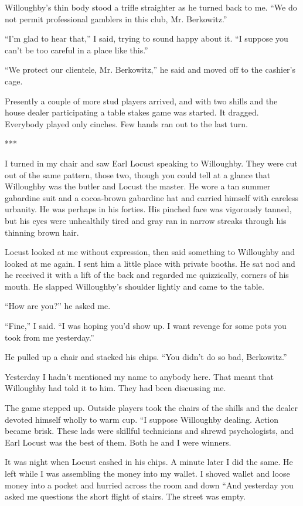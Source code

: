 \documentclass{novel}
\begin{document}
{Willoughby’s thin body stood a trifle straighter as he turned back to me. “We do not permit professional gamblers in this club, Mr. Berkowitz.”

“I’m glad to hear that,” I said, trying to sound happy about it. “I suppose you can’t be too careful in a place like this.”

“We protect our clientele, Mr. Berkowitz,” he said and moved off to the cashier’s cage.

Presently a couple of more stud players arrived, and with two shills and the house dealer participating a table stakes game was started. It dragged. Everybody played only cinches. Few hands ran out to the last turn.

***

I turned in my chair and saw Earl Locust speaking to Willoughby. They were cut out of the same pattern, those two, though you could tell at a glance that Willoughby was the butler and Locust the master. He wore a tan summer gabardine suit and a cocoa-brown gabardine hat and carried himself with careless urbanity. He was perhaps in his forties. His pinched face was vigorously tanned, but his eyes were unhealthily tired and gray ran in narrow streaks through his thinning brown hair.

Locust looked at me without expression, then said something to Willoughby and looked at me again. I sent him a little place with private booths. He sat nod and he received it with a lift of the back and regarded me quizzically, corners of his mouth. He slapped Willoughby’s shoulder lightly and came to the table.

“How are you?” he asked me.

“Fine,” I said. “I was hoping you’d show up. I want revenge for some pots you took from me yesterday.”

He pulled up a chair and stacked his chips. “You didn’t do so bad, Berkowitz.”

Yesterday I hadn’t mentioned my name to anybody here. That meant that Willoughby had told it to him. They had been discussing me.

The game stepped up. Outside players took the chairs of the shills and the dealer devoted himself wholly to warm cup. “I suppose Willoughby dealing. Action became brisk. These lads were skillful technicians and shrewd psychologists, and Earl Locust was the best of them. Both he and I were winners.

It was night when Locust cashed in his chips. A minute later I did the same. He left while I was assembling the money into my wallet. I shoved wallet and loose money into a pocket and hurried across the room and down “And yesterday you asked me questions the short flight of stairs. The street was empty.

}
\end{document}
